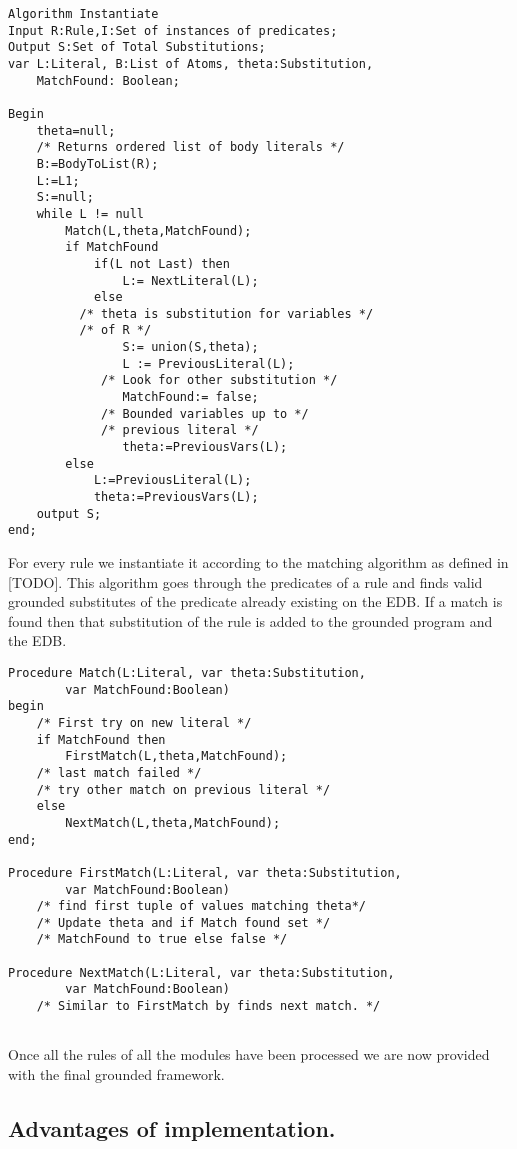 \begin{Verbatim}[frame=single]
Algorithm Instantiate
Input R:Rule,I:Set of instances of predicates;
Output S:Set of Total Substitutions;
var L:Literal, B:List of Atoms, theta:Substitution,
	MatchFound: Boolean;

Begin
	theta=null;
	/* Returns ordered list of body literals */
	B:=BodyToList(R);
	L:=L1;
	S:=null;
	while L != null
		Match(L,theta,MatchFound);
		if MatchFound
			if(L not Last) then
				L:= NextLiteral(L);
			else
		  /* theta is substitution for variables */
		  /* of R */
				S:= union(S,theta);
				L := PreviousLiteral(L);
			 /* Look for other substitution */
				MatchFound:= false;
			 /* Bounded variables up to */
			 /* previous literal */
				theta:=PreviousVars(L);
		else
			L:=PreviousLiteral(L);
			theta:=PreviousVars(L);
	output S;
end;
\end{Verbatim}

For every rule we instantiate it according to the matching algorithm as defined in [TODO]. This algorithm goes through the predicates of a rule and finds valid grounded substitutes of the predicate already existing on the EDB. If a match is found then that substitution of the rule is added to the grounded program and the EDB.

\begin{Verbatim}[frame=single]
Procedure Match(L:Literal, var theta:Substitution, 
		var MatchFound:Boolean)
begin
	/* First try on new literal */
	if MatchFound then 
		FirstMatch(L,theta,MatchFound);
	/* last match failed */
	/* try other match on previous literal */
	else
		NextMatch(L,theta,MatchFound);	
end;

Procedure FirstMatch(L:Literal, var theta:Substitution,
		var MatchFound:Boolean)
	/* find first tuple of values matching theta*/
	/* Update theta and if Match found set */
	/* MatchFound to true else false */	
		
Procedure NextMatch(L:Literal, var theta:Substitution,
		var MatchFound:Boolean)
	/* Similar to FirstMatch by finds next match. */
		
\end{Verbatim}

Once all the rules of all the modules have been processed we are now provided with the final grounded framework.

\subsection{Advantages of implementation.}

